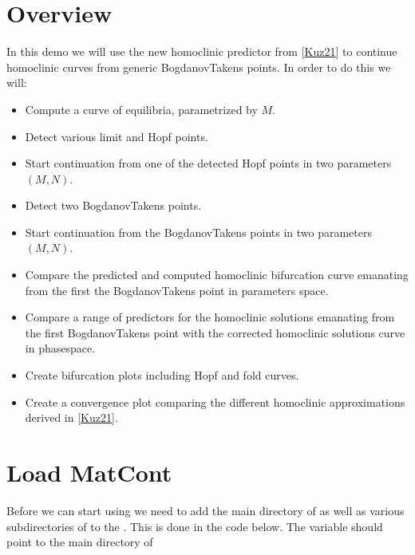\documentclass[letterpaper,10pt,english]{jupyterBook}
\begin{document}
\section{Overview}
\label{\detokenize{HomoclinicRGflows:overview}}
\sphinxAtStartPar
In this demo we will use the new homoclinic predictor from
{[}\hyperlink{cite.references:id3}{Kuz21}{]} to continue homoclinic curves from generic
Bogdanov\sphinxhyphen{}Takens points. In order to do this we will:
\begin{itemize}
\item {} 
\sphinxAtStartPar
Compute a curve of equilibria, parametrized by \(M\).

\item {} 
\sphinxAtStartPar
Detect various limit and Hopf points.

\item {} 
\sphinxAtStartPar
Start continuation from one of the detected Hopf points in two parameters \((M,N)\).

\item {} 
\sphinxAtStartPar
Detect two Bogdanov\sphinxhyphen{}Takens points.

\item {} 
\sphinxAtStartPar
Start continuation from the Bogdanov\sphinxhyphen{}Takens points in two parameters \((M,N)\).

\item {} 
\sphinxAtStartPar
Compare the predicted and computed homoclinic bifurcation curve emanating
from the first the Bogdanov\sphinxhyphen{}Takens point in parameters space.

\item {} 
\sphinxAtStartPar
Compare a range of predictors for the homoclinic solutions emanating from the
first Bogdanov\sphinxhyphen{}Takens point with the corrected homoclinic solutions curve in
phase\sphinxhyphen{}space.

\item {} 
\sphinxAtStartPar
Create bifurcation plots including Hopf and fold curves.

\item {} 
\sphinxAtStartPar
Create a convergence plot comparing the different homoclinic approximations
derived in {[}\hyperlink{cite.references:id3}{Kuz21}{]}.

\end{itemize}


\section{Load MatCont}
\label{\detokenize{HomoclinicRGflows:load-matcont}}
\sphinxAtStartPar
Before we can start using  we need to add the main directory of
 as well as various subdirectories of  to the . This is done in the code below. The variable 
should point to the main directory of 
\end{document}
